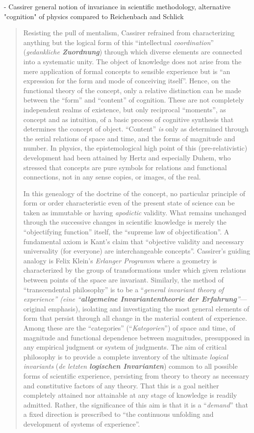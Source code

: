 - Cassirer general notion of invariance in scientific methodology, alternative "cognition" of physics compared to Reichenbach and Schlick

\begin{quote}
    Resisting the pull of mentalism, Cassirer refrained from characterizing anything but the logical form of this ``intellectual \emph{coordination}'' (\emph{gedankliche \textbf{Zuordnung}}) through which diverse elements are connected into a systematic unity.  The object of knowledge does not arise from the mere application of formal concepts to sensible experience but is ``an expression for the form and mode of conceiving itself''.  Hence, on the functional theory of the concept, only a relative distinction can be made between the ``form'' and ``content'' of cognition.  These are not completely independent realms of existence, but only reciprocal ``moments'', as concept and as intuition, of a basic process of cognitive synthesis that determines the concept of object.  ``Content'' \emph{is} only as determined through the serial relations of space and time, and the forms of magnitude and number.  In physics, the epistemological high point of this (pre-relativistic) development had been attained by Hertz and especially Duhem, who stressed that concepts are pure symbols for relations and functional connections, not in any sense copies, or images, of the real.
    
    In this genealogy of the doctrine of the concept, no particular principle of form or order characteristic even of the present state of science can be taken as immutable or having \emph{apodictic} validity.  What remains unchanged through the successive changes in scientific knowledge is merely the ``objectifying function'' itself, the ``supreme law of objectification''.  A fundamental axiom is Kant's claim that ``objective validity and necessary universality (for everyone) are interchangeable concepts''.  Cassirer's guiding analogy is Felix Klein's \emph{Erlanger Programm} where a geometry is characterized by the group of transformations under which given relations between points of the space are invariant.  Similarly, the method of ``transcendental philosophy'' is to be a ``\emph{general invariant theory of experience'' (\emph{eine ``\textbf{allgemeine Invariantentheorie der Erfahrung}}''}---original emphasis), isolating and investigating the most general elements of form that persist through all change in the material content of experience.  Among these are the ``categories'' (``\emph{Kategorien}'') of space and time, of magnitude and functional dependence between magnitudes, presupposed in any empirical judgment or system of judgments.  The aim of critical philosophy is to provide a complete inventory of the ultimate \emph{logical invariants} (\emph{de letzten \textbf{logischen Invarianten}}) common to all possible forms of scientific experience, persisting from theory to theory as necessary and constitutive factors of any theory.  That this is a goal neither completely attained nor attainable at any stage of knowledge is readily admitted.  Rather, the significance of this aim is that it is a ``\emph{demand}'' that a fixed direction is prescribed to ``the continuous unfolding and development of systems of experience''.
    

\end{quote}
